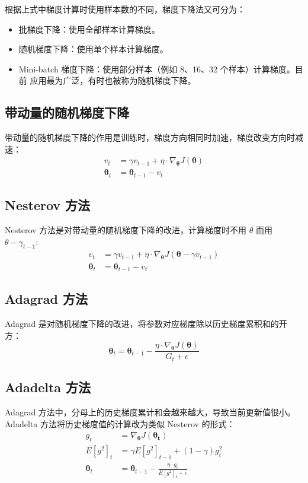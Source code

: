 根据上式中梯度计算时使用样本数的不同，梯度下降法又可分为：
\begin{itemize}
  \item 批梯度下降：使用全部样本计算梯度。
  \item 随机梯度下降：使用单个样本计算梯度。
  \item Mini-batch 梯度下降：使用部分样本（例如 8、16、32 个样本）计算梯度。目前
    应用最为广泛，有时也被称为随机梯度下降。
\end{itemize}

\subsection{带动量的随机梯度下降}
带动量的随机梯度下降的作用是训练时，梯度方向相同时加速，梯度改变方向时减速：
\begin{align}
  v_t & = \gamma v_{t-1} + \eta \cdot \nabla_{\boldsymbol{\theta}}J(\boldsymbol{\theta}) \\ 
  \boldsymbol{\theta}_{t} & = \boldsymbol{\theta}_{t-1} - v_t
\end{align}

\subsection{Nesterov 方法}
Nesterov 方法是对带动量的随机梯度下降的改进，计算梯度时不用 $\theta$ 而用
$\theta - \gamma_{t-1}$:
\begin{align}
  v_t & = \gamma v_{t-1} + \eta \cdot \nabla_{\boldsymbol{\theta}}J(\boldsymbol{\theta}-\gamma v_{t-1}) \\ 
  \boldsymbol{\theta}_{t} & = \boldsymbol{\theta}_{t-1} - v_t
\end{align}

\subsection{Adagrad 方法}
Adagrad 是对随机梯度下降的改进，将参数对应梯度除以历史梯度累积和的开方：
\begin{equation}
  \boldsymbol{\theta}_{t} = \boldsymbol{\theta}_{t-1} - \frac{\eta \cdot \nabla_{\boldsymbol{\theta}}J(\boldsymbol{\theta})}{G_t + \epsilon}
\end{equation}

\subsection{Adadelta 方法}
Adagrad 方法中，分母上的历史梯度累计和会越来越大，导致当前更新值很小。Adadelta
方法将历史梯度值的计算改为类似 Nesterov 的形式：
\begin{align}
  g_t & = \nabla_{\boldsymbol{\theta}}J(\boldsymbol{\theta_t}) \\
  E[g^2]_t & = \gamma E[g^2]_{t-1} + (1-\gamma)g_t^2 \\
  \boldsymbol{\theta}_{t} & = \boldsymbol{\theta}_{t-1} - \frac{\eta \cdot g_t}{E[g^2]_t+\epsilon}
\end{align}

